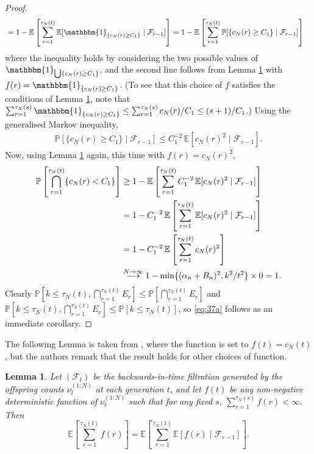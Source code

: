 \documentclass{article}
\newtheorem{lemma}{Lemma}
\newcommand{\Prob}{\mathbb{P}}
\newcommand{\E}{\mathbb{E}}
\newcommand{\1}[1]{\mathbbm{1}_{#1}}
\begin{document}
\begin{proof}
\begin{align}
&= 1 - \E \left[ \sum_{r=1}^{\tau_N(t)}  \E [ \1{\{c_N(r) \geq C_1\}} \mid \mathcal{F}_{r-1} ] \right]
= 1 - \E \left[ \sum_{r=1}^{\tau_N(t)} \Prob [\{c_N(r) \geq C_1\} \mid \mathcal{F}_{r-1} ] \right] 
\end{align}
where the inequality holds by considering the two possible values of $\1{\bigcup \{c_N(r) \geq C_1\}}$, and the second line follows from Lemma \ref{thm:kjjslemma2} with $f(r) = \1{\{c_N(r) \geq C_1\}}$.
(To see that this choice of $f$ satisfies the conditions of Lemma \ref{thm:kjjslemma2}, note that $\sum_{r=1}^{\tau_N(s)} \1{\{c_N(r) \geq C_1\}} \leq \sum_{r=1}^{\tau_N(s)} c_N(r) / C_1 \leq (s+1)/C_1$.)
Using the generalised Markov inequality,
\begin{align}
\Prob [\{c_N(r) \geq C_1\} \mid \mathcal{F}_{r-1} ] 
\leq C_1^{-2} \, \E[c_N(r)^2 \mid \mathcal{F}_{r-1} ] .
\end{align}
Now, using Lemma \ref{thm:kjjslemma2} again, this time with $f(r) = c_N(r)^2$,
\begin{align}
\Prob \left[  \bigcap_{r=1}^{\tau_N(t)} \{c_N(r) < C_1\} \right]
&\geq 1 - \E \left[  \sum_{r=1}^{\tau_N(t)} C_1^{-2} \, \E[c_N(r)^2 \mid \mathcal{F}_{r-1} ] \right] \notag\\
&= 1 - C_1^{-2} \,
\E \left[ \sum_{r=1}^{\tau_N(t)} \E[c_N(r)^2 \mid \mathcal{F}_{r-1} ] \right] \notag\\
&= 1 - C_1^{-2} \,
\E \left[ \sum_{r=1}^{\tau_N(t)} c_N(r)^2 \right] \notag\\
&\overset{N\to\infty}{\longrightarrow} 1 - \min\{(\alpha_n + B_n)^2 , k^2/t^2 \} \times 0 = 1 .
\end{align}
Clearly $\Prob \left[k \leq \tau_N(t), \bigcap_{r=1}^{\tau_N(t)} E_r \right] \leq \Prob \left[\bigcap_{r=1}^{\tau_N(t)} E_r \right]$ and $\Prob \left[k \leq \tau_N(t), \bigcap_{r=1}^{\tau_N(t)} E_r \right] \leq \Prob \left[ k \leq \tau_N(t) \right]$, so \eqref{eq:37a} follows as an immediate corollary.
\end{proof}


The following Lemma is taken from \citet[Lemma 2]{koskela2018}, where the function is set to $f(t) = c_N(t)$, but the authors remark that the result holds for other choices of function.
\begin{lemma}\label{thm:kjjslemma2}
Let $(\mathcal{F}_t)$ be the backwards-in-time filtration generated by the offspring counts $\nu_t^{(1:N)}$ at each generation $t$,
and let $f(t)$ be any non-negative deterministic function of $\nu_t^{(1:N)}$ such that for any fixed $s$, $\sum_{r=1}^{\tau_N(s)} f(r) < \infty$.
Then
\begin{equation}
\E \left[ \sum_{r=1}^{\tau_N(t)} f(r) \right] 
= \E \left[ \sum_{r=1}^{\tau_N(t)} \E [ f(r) \mid \mathcal{F}_{r-1} ] \right] .
\end{equation}
\end{lemma}
\end{document}

